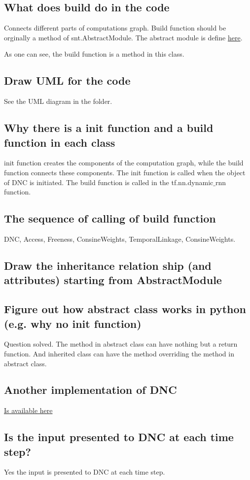 \documentclass{article}
\begin{document}
\subsection{What does build do in the code}
Connects different parts of computations graph. Build function should be orginally a method of snt.AbstractModule. The abstract module is define 
\href{https://github.com/deepmind/sonnet/blob/master/sonnet/python/modules/base.py}{here}.

As one can see, the build function is a method in this class.
\subsection{Draw UML for the code}
See the UML diagram in the folder.
\subsection{Why there is a init function and a build function in each class}
init function creates the components of the computation graph, while the build function connects these components. The init function is called when the object of DNC is initiated. The build function is called in the tf.nn.dynamic$\_$rnn function.
\subsection{The sequence of calling of build function}
DNC, Access, Freeness, ConsineWeights, TemporalLinkage, ConsineWeights.
\subsection{Draw the inheritance relation ship (and attributes) starting from AbstractModule}
\subsection{Figure out how abstract class works in python (e.g. why no init function)}
Question solved. The method in abstract class can have nothing but a return function. And inherited class can have the method overriding the method in abstract class.

\subsection{Another implementation of DNC}
\href{https://github.com/Mostafa-Samir/DNC-tensorflow/blob/master/dnc/dnc.py}{Is available here}

\subsection{Is the input presented to DNC at each time step?}
Yes the input is presented to DNC at each time step.
\end{document}
